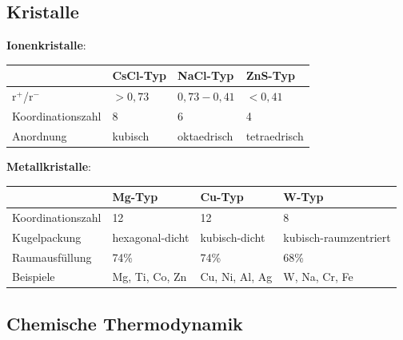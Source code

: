 \documentclass[12pt,a4paper]{article}
\renewcommand{\=}[1]{\stackrel{#1}{=}}
\theoremstyle{definition}
\theoremstyle{remark}
\begin{document}
\subsection{Kristalle}

\begin{framed}
\noindent \textbf{Ionenkristalle}:\\
\begin{tabularx}{\textwidth}{X|XXX}
 & CsCl-Typ & NaCl-Typ & ZnS-Typ\\
\hline
r$^+$/r$^-$ & $> 0,73$ & $0,73 - 0,41$ & $< 0,41$\\
Koordinationszahl & 8 & 6 & 4\\
Anordnung & kubisch & oktaedrisch & tetraedrisch
\end{tabularx}
\end{framed}
\begin{framed}
\noindent \textbf{Metallkristalle}:\\
\begin{tabularx}{\textwidth}{X|XXX}
 & Mg-Typ & Cu-Typ & W-Typ\\
\hline
Koordinationszahl & 12 & 12 & 8\\
Kugelpackung & hexagonal-dicht & kubisch-dicht & kubisch-raumzentriert\\
Raumausfüllung & 74\% & 74\% & 68\%\\
Beispiele & Mg, Ti, Co, Zn & Cu, Ni, Al, Ag & W, Na, Cr, Fe
\end{tabularx}
\end{framed}

\subsection{Chemische Thermodynamik}
\end{document}
